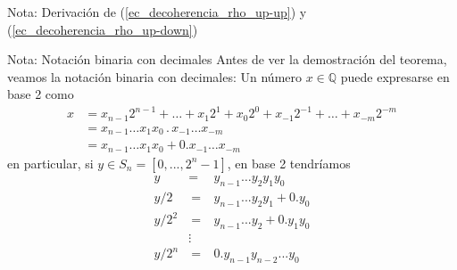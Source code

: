 \documentclass[a4paper,11pt]{book} %
\numberwithin{equation}{chapter}
\begin{document}
\begin{mybox_blue}{Nota: Derivación de (\ref{ec_decoherencia_rho_up-up}) y  (\ref{ec_decoherencia_rho_up-down})}
	 \begin{mybox_blue}{Nota: Notación binaria con decimales}
	 Antes de ver la demostración del teorema, veamos la notación binaria con decimales: Un número $x \in \mathbb{Q}$ puede expresarse en base 2 como
	 \begin{align*}
	 x & = x_{n-1} 2^{n-1} + \dots + x_1 2^1 + x_0 2^0 + x_{-1} 2^{-1} + \dots + x_{-m} 2^{-m} \\
	   & = x_{n-1} \dots x_1 x_0 \, . \, x_{-1} \dots x_{-m} \\
	   & = x_{n-1} \dots x_1 x_0 + 0.x_{-1} \dots x_{-m}
	 \end{align*}
	 en particular, si $y\in S_n =[0,...,2^n-1]$, en base 2 tendríamos
	\begin{eqnarray}
	y &=& y_{n-1} \ldots   y_2y_1 y_0 \nonumber\\  
	y/2&~=~&  y_{n-1}...y_2y_1 + 0. y_0 \nonumber\\ 
	y/2^2 &~=~&  y_{n-1}...y_2 + 0.y_1 y_0 \nonumber\\ 
	&\vdots & \nonumber \\ 
	y/2^n &~=~&   0.y_{n-1}y_{n-2}...y_0 \, 
	\end{eqnarray}
	 \end{mybox_blue}
	
	
	

\end{mybox_blue}
\end{document}
